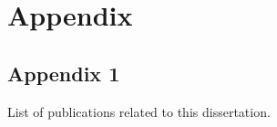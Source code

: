 \chapter{Appendix}
\section{Appendix 1}
\noindent
List of publications related to this dissertation.
